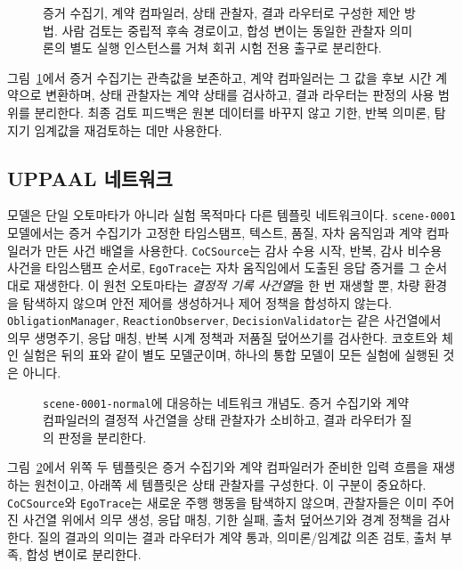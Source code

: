 \begin{figure}[t]
\centering

\caption{증거 수집기, 계약 컴파일러, 상태 관찰자, 결과 라우터로 구성한 제안 방법. 사람 검토는 중립적 후속 경로이고, 합성 변이는 동일한 관찰자 의미론의 별도 실행 인스턴스를 거쳐 회귀 시험 전용 출구로 분리한다.}
\label{fig:method-pipeline}
\end{figure}

그림~\ref{fig:method-pipeline}에서 증거 수집기는 관측값을 보존하고, 계약 컴파일러는 그 값을 후보 시간 계약으로 변환하며, 상태 관찰자는 계약 상태를 검사하고, 결과 라우터는 판정의 사용 범위를 분리한다. 최종 검토 피드백은 원본 데이터를 바꾸지 않고 기한, 반복 의미론, 탐지기 임계값을 재검토하는 데만 사용한다.

\subsection{UPPAAL 네트워크}
\uppaal 모델은 단일 오토마타가 아니라 실험 목적마다 다른 템플릿 네트워크이다. \texttt{scene-0001} 모델에서는 증거 수집기가 고정한 타임스탬프, 텍스트, 품질, 자차 움직임과 계약 컴파일러가 만든 사건 배열을 사용한다. \texttt{CoCSource}는 감사 수용 시작, 반복, 감사 비수용 사건을 타임스탬프 순서로, \texttt{EgoTrace}는 자차 움직임에서 도출된 응답 증거를 그 순서대로 재생한다. 이 원천 오토마타는 \emph{결정적 기록 사건열}을 한 번 재생할 뿐, 차량 환경을 탐색하지 않으며 안전 제어를 생성하거나 제어 정책을 합성하지 않는다. \texttt{ObligationManager}, \texttt{ReactionObserver}, \texttt{DecisionValidator}는 같은 사건열에서 의무 생명주기, 응답 매칭, 반복 시계 정책과 저품질 덮어쓰기를 검사한다. 코호트와 체인 실험은 뒤의 표와 같이 별도 모델군이며, 하나의 통합 모델이 모든 실험에 실행된 것은 아니다.

\begin{figure}[t]
\centering

\caption{\texttt{scene-0001-normal}에 대응하는 \uppaal 네트워크 개념도. 증거 수집기와 계약 컴파일러의 결정적 사건열을 상태 관찰자가 소비하고, 결과 라우터가 질의 판정을 분리한다.}
\label{fig:uppaal-network}
\end{figure}

그림~\ref{fig:uppaal-network}에서 위쪽 두 템플릿은 증거 수집기와 계약 컴파일러가 준비한 입력 흐름을 재생하는 원천이고, 아래쪽 세 템플릿은 상태 관찰자를 구성한다. 이 구분이 중요하다. \texttt{CoCSource}와 \texttt{EgoTrace}는 새로운 주행 행동을 탐색하지 않으며, 관찰자들은 이미 주어진 사건열 위에서 의무 생성, 응답 매칭, 기한 실패, 출처 덮어쓰기와 경계 정책을 검사한다. 질의 결과의 의미는 결과 라우터가 계약 통과, 의미론/임계값 의존 검토, 출처 부족, 합성 변이로 분리한다.

